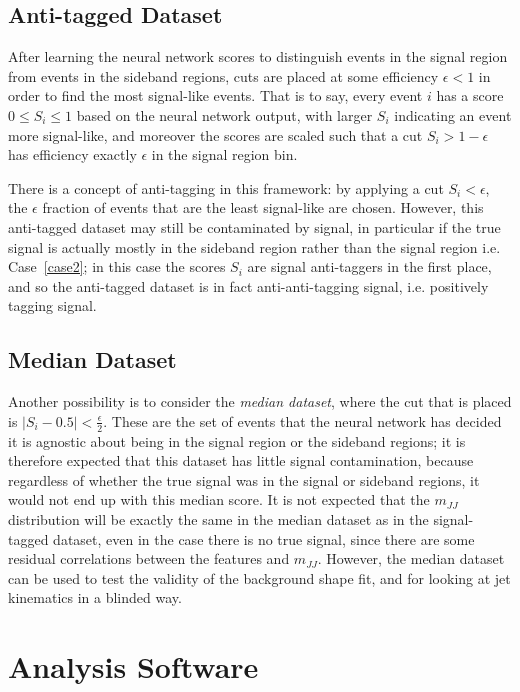 \subsection{Anti-tagged Dataset}
After learning the neural network scores to distinguish events in the signal region from events in the sideband regions, cuts are placed at some efficiency $\epsilon < 1$ in order to find the most signal-like events.
That is to say, every event $i$ has a score $0\le S_i \le 1$ based on the neural network output, with larger $S_i$ indicating an event more signal-like, and moreover the scores are scaled such that a cut $S_i>1-\epsilon$ has efficiency exactly $\epsilon$ in the signal region bin.

There is a concept of anti-tagging in this framework: by applying a cut $S_i<\epsilon$, the $\epsilon$ fraction of events that are the least signal-like are chosen.
However, this anti-tagged dataset may still be contaminated by signal, in particular if the true signal is actually mostly in the sideband region rather than the signal region i.e. Case~\ref{case2}; in this case the scores $S_i$ are signal anti-taggers in the first place, and so the anti-tagged dataset is in fact anti-anti-tagging signal, i.e. positively tagging signal.

\subsection{Median Dataset}
Another possibility is to consider the \textit{median dataset}, where the cut that is placed is $|S_i-0.5|<\frac{\epsilon}{2}$.
These are the set of events that the neural network has decided it is agnostic about being in the signal region or the sideband regions; it is therefore expected that this dataset has little signal contamination, because regardless of whether the true signal was in the signal or sideband regions, it would not end up with this median score.
It is not expected that the $m_{JJ}$ distribution will be exactly the same in the median dataset as in the signal-tagged dataset, even in the case there is no true signal, since there are some residual correlations between the features and $m_{JJ}$.
However, the median dataset can be used to test the validity of the background shape fit, and for looking at jet kinematics in a blinded way.

\section{Analysis Software}
\label{app:CWoLa:software}

